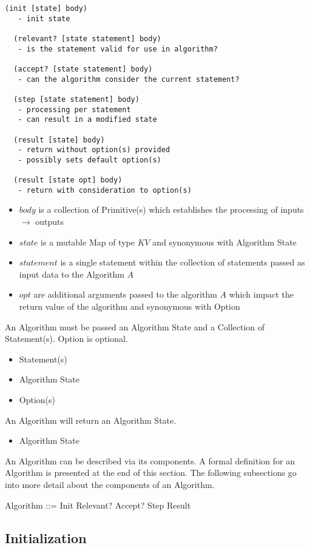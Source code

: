 \documentclass[../main.tex]{subfiles}
\begin{document}
\begin{lstlisting}[frame=single]
  (init [state] body)
   - init state

  (relevant? [state statement] body)
   - is the statement valid for use in algorithm?

  (accept? [state statement] body)
   - can the algorithm consider the current statement?

  (step [state statement] body)
   - processing per statement
   - can result in a modified state

  (result [state] body)
   - return without option(s) provided
   - possibly sets default option(s)

  (result [state opt] body)
   - return with consideration to option(s)
\end{lstlisting}
\begin{itemize}
\item $body$ is a collection of Primitive(s) which establishes the processing of inputs $\to$ outputs
\item $state$ is a mutable Map of type $KV$ and synonymous with Algorithm State
\item $statement$ is a single statement within the collection of statements passed as input data to the Algorithm $A$
\item $opt$ are additional arguments passed to the algorithm $A$ which impact the return value of the algorithm and synonymous with Option
\end{itemize}
An Algorithm must be passed an Algorithm State and a Collection of Statement(s). Option is optional.
\begin{itemize}
\item Statement(s)
\item Algorithm State
\item Option(s)
\end{itemize}
An Algorithm will return an Algorithm State.
\begin{itemize}
\item Algorithm State
\end{itemize}
An Algorithm can be described via its components. A formal definition for an Algorithm
is presented at the end of this section. The following subsections go into more detail about the components of an Algorithm.
\begin{zed}
  Algorithm ::= Init \semi Relevant? \semi Accept? \semi Step \semi Result
\end{zed}

\subsection{Initialization}
\end{document}
